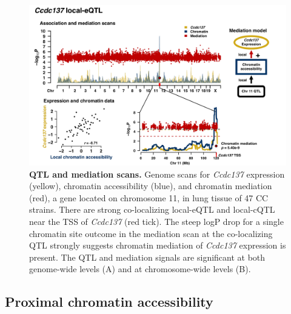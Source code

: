 \begin{figure}[h]
\includegraphics[width=\textwidth, trim={0in 0in 0in 0in}, clip]{figs/ccdc137_mediation.pdf}
\caption{\textbf{QTL and mediation scans.} Genome scans for \textit{Ccdc137} expression (yellow), chromatin accessibility (blue), and chromatin mediation (red), a gene located on chromosome 11, in lung tissue of 47 CC strains. There are strong co-localizing local-eQTL and local-cQTL near the TSS of \textit{Ccdc137} (red tick). The steep logP drop for a single chromatin site outcome in the mediation scan at the co-localizing QTL strongly suggests chromatin mediation of \textit{Ccdc137} expression is present. The QTL and mediation signals are significant at both genome-wide levels (A) and at chromosome-wide levels (B). \label{fig:ccdc137_mediation}}
\end{figure}

\subsection{Proximal chromatin accessibility}

